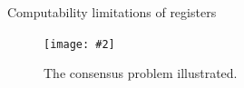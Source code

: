 \documentclass{beamer}
\makeatletter
\newcommand{\citeinbeamer}[3]{{\scriptsize{\textcolor{blue}{[#1@#2'#3]}}}}
\newcommand{\fignocaption}[2]
{
  \begin{figure}[htp]
    \centering
      \texttt{[image: \#2]}
  \end{figure}
}
\newcommand{\fig}[3]
{
  \begin{figure}[htp]
    \centering
      \texttt{[image: \#2]}
      \caption[labelInTOC]{#3}
  \end{figure}
}
\newcommand{\largepurple}[1]{\textcolor{purple}{\large #1}}
\makeatother
\begin{document}
\begin{frame}{Computability limitations of registers}


  \fig{width = 0.95\textwidth}{fig/consensus-from-herlihy.pdf}
  {The consensus problem illustrated.}

%
\end{frame}

\end{document}
